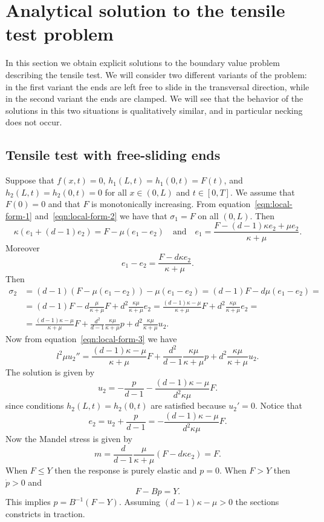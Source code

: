 \documentclass[a4paper,10pt,oneside]{amsbook}
\numberwithin{section}{chapter}
\numberwithin{equation}{chapter}
\theoremstyle{definition}
\begin{document}
\section{Analytical solution to the tensile test problem}

In this section we obtain explicit solutions to the boundary value problem describing the tensile test. We will consider two different variants of the problem: in the first variant the ends are left free to slide in the transversal direction, while in the second variant the ends are clamped. We will see that the behavior of the solutions in this two situations is qualitatively similar, and in particular necking does not occur.

\subsection{Tensile test with free-sliding ends}
\label{subsec:homogeneous-solution}

Suppose that $f(x,t)=0$, $h_1(L,t)=h_1(0,t)=F(t)$, and $h_2(L,t)=h_2(0,t)=0$ for all $x\in(0,L)$ and $t\in[0,T]$. We assume that $F(0)=0$ and that $F$ is monotonically increasing. From equation~\eqref{eqn:local-form-1} and~\eqref{eqn:local-form-2} we have that $\sigma_1=F$ on all $(0,L)$. Then
\[
\kappa(e_1+(d-1)e_2)=F-\mu(e_1-e_2)\quad\text{and}\quad e_1=\frac{F-(d-1)\kappa e_2+\mu e_2}{\kappa+\mu}.
\]
Moreover
\[
e_1-e_2=\frac{F-d\kappa e_2}{\kappa+\mu}.
\]
Then
\[
\begin{split}
\sigma_2&=(d-1)\left(F-\mu(e_1-e_2)\right)-\mu(e_1-e_2)=(d-1)F-d\mu(e_1-e_2)=\\
&=(d-1)F-d\frac{\mu}{\kappa+\mu}F+d^2\frac{\kappa\mu}{\kappa+\mu}e_2=\frac{(d-1)\kappa-\mu}{\kappa+\mu}F+d^2\frac{\kappa\mu}{\kappa+\mu}e_2=\\
&=\frac{(d-1)\kappa-\mu}{\kappa+\mu}F+\frac{d^2}{d-1}\frac{\kappa\mu}{\kappa+\mu}p+d^2\frac{\kappa\mu}{\kappa+\mu}u_2.
\end{split}
\]
Now from equation~\eqref{eqn:local-form-3} we have
\[
l^2\mu u_2''=\frac{(d-1)\kappa-\mu}{\kappa+\mu}F+\frac{d^2}{d-1}\frac{\kappa\mu}{\kappa+\mu}p+d^2\frac{\kappa\mu}{\kappa+\mu}u_2.
\]
The solution is given by
\[
u_2=-\frac{p}{d-1}-\frac{(d-1)\kappa-\mu}{d^2\kappa\mu}F.
\]
since conditions $h_2(L,t)=h_2(0,t)$ are satisfied because $u_2'=0$. Notice that
\[
e_2=u_2+\frac{p}{d-1}=-\frac{(d-1)\kappa-\mu}{d^2\kappa\mu}F.
\]
Now the Mandel stress is given by
\[
m=\frac{d}{d-1}\frac{\mu}{\kappa+\mu}(F-d\kappa e_2)=F.
\]
When $F\le Y$ then the response is purely elastic and $p=0$. When $F>Y$ then $\dot p>0$ and
\[
F-Bp=Y.
\]
This implies $p=B^{-1}(F-Y)$. Assuming $(d-1)\kappa-\mu>0$ the sections constricts in traction.
\end{document}
